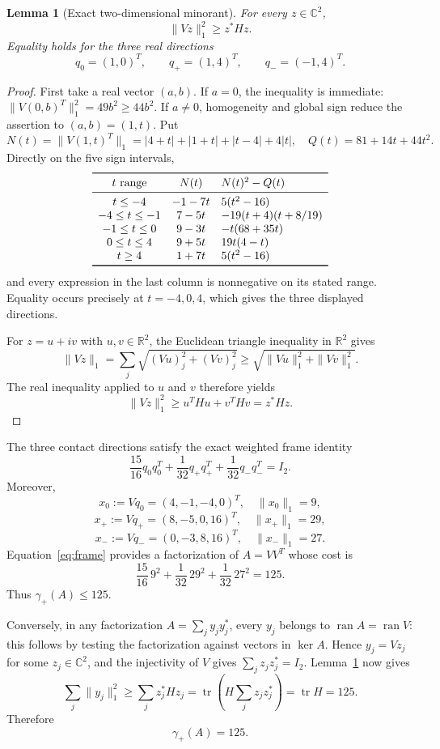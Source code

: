 \documentclass[11pt]{article}
\newtheorem{lemma}{Lemma}
\newcommand{\gp}{\gamma_+}
\newcommand{\C}{\mathbb C}
\newcommand{\tr}{\operatorname{tr}}
\begin{document}
\begin{lemma}[Exact two-dimensional minorant]\label{lem:minorant}
For every $z\in\C^2$,
\[
 \|Vz\|_1^2\geq z^*Hz.
\]
Equality holds for the three real directions
\[
 q_0=(1,0)^T,\qquad q_+=(1,4)^T,\qquad q_-=(-1,4)^T.
\]
\end{lemma}

\begin{proof}
First take a real vector $(a,b)$. If $a=0$, the inequality is immediate:
$\|V(0,b)^T\|_1^2=49b^2\geq44b^2$. If $a\ne0$, homogeneity and global sign
reduce the assertion to $(a,b)=(1,t)$. Put
\[
 N(t)=\|V(1,t)^T\|_1
 =|4+t|+|1+t|+|t-4|+4|t|,
 \quad Q(t)=81+14t+44t^2.
\]
Directly on the five sign intervals,
\[
\begin{array}{ccl}
\toprule
t\text{ range}&N(t)&N(t)^2-Q(t)\\
\midrule
t\leq-4&-1-7t&5(t^2-16)\\
-4\leq t\leq-1&7-5t&-19(t+4)(t+8/19)\\
-1\leq t\leq0&9-3t&-t(68+35t)\\
0\leq t\leq4&9+5t&19t(4-t)\\
t\geq4&1+7t&5(t^2-16)\\
\bottomrule
\end{array}
\]
and every expression in the last column is nonnegative on its stated range.
Equality occurs precisely at $t=-4,0,4$, which gives the three displayed
directions.

For $z=u+iv$ with $u,v\in\mathbb R^2$, the Euclidean triangle inequality in
$\mathbb R^2$ gives
\[
 \|Vz\|_1
 =\sum_j\sqrt{(Vu)_j^2+(Vv)_j^2}
 \geq\sqrt{\|Vu\|_1^2+\|Vv\|_1^2}.
\]
The real inequality applied to $u$ and $v$ therefore yields
\[
 \|Vz\|_1^2\geq u^THu+v^THv=z^*Hz.
\]
\end{proof}

The three contact directions satisfy the exact weighted frame identity
\begin{equation}\label{eq:frame}
 \frac{15}{16}q_0q_0^T+
 \frac1{32}q_+q_+^T+
 \frac1{32}q_-q_-^T=I_2.
\end{equation}
Moreover,
\[
 x_0:=Vq_0=(4,-1,-4,0)^T,\quad \|x_0\|_1=9,
\]
\[
 x_+:=Vq_+=(8,-5,0,16)^T,\quad \|x_+\|_1=29,
\]
\[
 x_-:=Vq_-=(0,-3,8,16)^T,\quad \|x_-\|_1=27.
\]
Equation~\eqref{eq:frame} provides a factorization of $A=VV^T$ whose cost is
\[
 \frac{15}{16}\,9^2+\frac{1}{32}\,29^2+\frac{1}{32}\,27^2=125.
\]
Thus $\gp(A)\leq125$.

Conversely, in any factorization $A=\sum_jy_jy_j^*$, every $y_j$ belongs to
$\operatorname{ran}A=\operatorname{ran}V$: this follows by testing the
factorization against vectors in $\ker A$. Hence $y_j=Vz_j$ for some
$z_j\in\C^2$, and the injectivity of $V$ gives
$\sum_jz_jz_j^*=I_2$. Lemma~\ref{lem:minorant} now gives
\[
 \sum_j\|y_j\|_1^2
 \geq\sum_jz_j^*Hz_j
 =\tr\left(H\sum_jz_jz_j^*\right)
 =\tr H=125.
\]
Therefore
\begin{equation}\label{eq:exactvalue}
 \gp(A)=125.
\end{equation}
\end{document}
